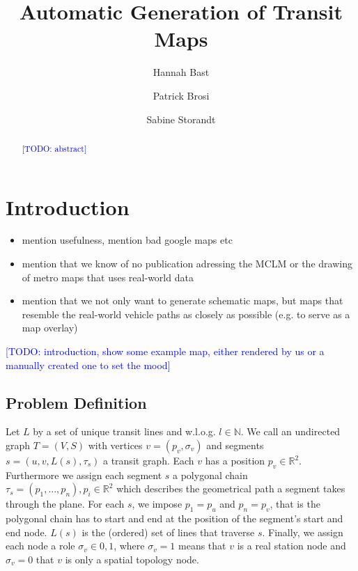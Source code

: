 \documentclass{llncs}
\newcommand\todo[1]{\textcolor{blue}{[TODO: #1]}}
\begin{document}
%
\mainmatter
%
\title{Automatic Generation of Transit Maps}
%
%
\author{Hannah Bast \and Patrick Brosi \and
Sabine Storandt}
%
%
%

\maketitle

\begin{abstract}
	\todo{abstract}
\end{abstract}

%
\section{Introduction}\label{SEC:intro}
%
\begin{itemize}
	\item mention usefulness, mention bad google maps etc
	\item mention that we know of no publication adressing the MCLM or the drawing of metro maps that uses real-world data
	\item mention that we not only want to generate schematic maps, but maps that resemble the real-world vehicle paths as closely as possible (e.g. to serve as a map overlay)
\end{itemize}
\todo{introduction, show some example map, either rendered by us or a manually created one to set the mood}

%
\subsection{Problem Definition}\label{SEC:def}
%
Let $L$ by a set of unique transit lines and w.l.o.g. $l \in \mathbb{N}$. We call an undirected graph $T = (V, S)$ with vertices $v = (p_v, \sigma_v)$ and segments $s = (u, v, L(s), \tau_s)$ a transit graph. Each $v$ has a position $p_v \in \mathbb{R}^2$. Furthermore we assign each segment $s$ a polygonal chain $\tau_s = (p_1, ..., p_n), p_i \in \mathbb{R}^2$ which describes the geometrical path a segment takes through the plane. For each $s$, we impose $p_1 = p_u$ and $p_n = p_v$, that is the polygonal chain has to start and end at the position of the segment's start and end node. $L(s)$ is the (ordered) set of lines that traverse $s$. Finally, we assign each node a role $\sigma_v \in {0, 1}$, where $\sigma_v = 1$ means that $v$ is a real station node and $\sigma_v = 0$ that $v$ is only a spatial topology node.
\end{document}
